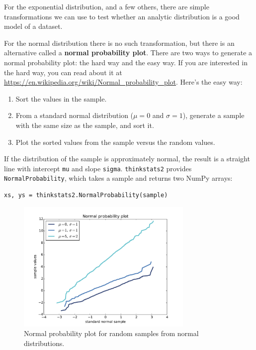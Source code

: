 \documentclass[12pt]{book}
\begin{document}
For the exponential distribution, and a few others, there are
simple transformations we can use to test whether an analytic
distribution is a good model of a dataset.

For the normal distribution there is no such transformation, but there
is an alternative called a {\bf normal probability plot}.  There
are two ways to generate a normal probability plot: the hard way
and the easy way.  If you are interested in the hard way, you can
read about it at \url{https://en.wikipedia.org/wiki/Normal_probability_plot}.
Here's the easy way:

\begin{enumerate}

\item Sort the values in the sample.

\item From a standard normal distribution ($\mu=0$ and $\sigma=1$),
generate a sample with the same size as the sample, and sort it.

\item Plot the sorted values from the sample versus the random values.

\end{enumerate}

If the distribution of the sample is approximately normal, the result
is a straight line with intercept {\tt mu} and slope {\tt sigma}.
{\tt thinkstats2} provides {\tt NormalProbability}, which takes a
sample and returns two NumPy arrays:

\begin{verbatim}
xs, ys = thinkstats2.NormalProbability(sample)
\end{verbatim}

\begin{figure}
\centerline{\includegraphics[height=2.5in]{figs/analytic_normal_prob_example.pdf}}
\caption{Normal probability plot for random samples from normal distributions.}
\label{analytic_normal_prob_example}
\end{figure}
\end{document}
